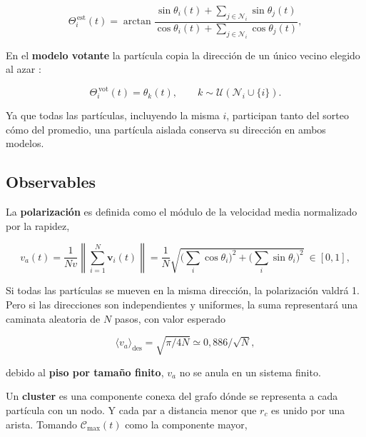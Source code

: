 \documentclass[10pt,a4paper]{article}
\newcommand{\va}{\ensuremath{v_a}}
\newcommand{\Cmax}{\ensuremath{\mathcal{C}_{\mathrm{max}}}}
\begin{document}
\begin{equation}
    \Theta_i^{\,\text{est}}(t) = \arctan\!
    \frac{\sin\theta_i(t) + \sum_{j \in \mathcal{N}_i} \sin\theta_j(t)}
         {\cos\theta_i(t) + \sum_{j \in \mathcal{N}_i} \cos\theta_j(t)},
    \label{eq:vicsek}
\end{equation}

En el \textbf{modelo votante} la partícula copia la dirección de un único vecino elegido al azar \cite{loscar2021}:

\begin{equation}
    \Theta_i^{\,\text{vot}}(t) = \theta_k(t),
    \qquad
    k \sim \mathcal{U}\!\left(\mathcal{N}_i \cup \{i\}\right).
    \label{eq:votante}
\end{equation}

Ya que todas las partículas, incluyendo la misma $i$, participan tanto del sorteo cómo del promedio, una partícula aislada conserva su dirección en ambos modelos.

\subsection{Observables}

La \textbf{polarización} es definida como el módulo de la velocidad media normalizado por la rapidez,

\begin{equation}
    \va(t) = \frac{1}{N v} \left\| \sum_{i=1}^{N} \mathbf{v}_i(t) \right\|
           = \frac{1}{N} \sqrt{ \Big(\textstyle\sum_i \cos\theta_i\Big)^{2}
                              + \Big(\textstyle\sum_i \sin\theta_i\Big)^{2} }\ \in [0,1],
    \label{eq:polarizacion}
\end{equation}

Si todas las partículas se mueven en la misma dirección, la polarización valdrá 1. Pero si las direcciones son independientes y uniformes, la suma representará una caminata aleatoria de $N$ pasos, con valor esperado

\begin{equation}
    \langle \va \rangle_{\text{des}} = \sqrt{\pi/4N} \simeq 0{,}886/\sqrt{N},
    \label{eq:piso}
\end{equation}

debido al \textbf{piso por tamaño finito}, \va{} no se anula en un sistema finito.

Un \textbf{cluster} es una componente conexa del grafo dónde se representa a cada partícula con un nodo. Y cada par a distancia menor que $r_c$ es unido por una arista. Tomando $\Cmax(t)$ como la componente mayor,
\end{document}
